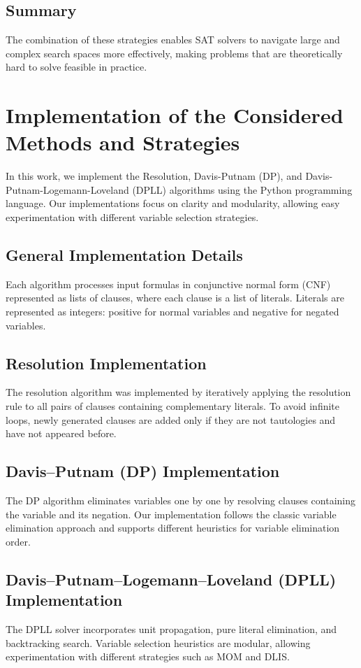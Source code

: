 \documentclass{article}
\begin{document}
\subsection{Summary}
The combination of these strategies enables SAT solvers to navigate large and complex search spaces more effectively, making problems that are theoretically hard to solve feasible in practice.

\section{Implementation of the Considered Methods and Strategies}

In this work, we implement the Resolution, Davis-Putnam (DP), and Davis-Putnam-Logemann-Loveland (DPLL) algorithms using the Python programming language. Our implementations focus on clarity and modularity, allowing easy experimentation with different variable selection strategies.

\subsection{General Implementation Details}
Each algorithm processes input formulas in conjunctive normal form (CNF) represented as lists of clauses, where each clause is a list of literals. Literals are represented as integers: positive for normal variables and negative for negated variables.

\subsection{Resolution Implementation}
The resolution algorithm was implemented by iteratively applying the resolution rule to all pairs of clauses containing complementary literals. To avoid infinite loops, newly generated clauses are added only if they are not tautologies and have not appeared before.

\subsection{Davis–Putnam (DP) Implementation}
The DP algorithm eliminates variables one by one by resolving clauses containing the variable and its negation. Our implementation follows the classic variable elimination approach and supports different heuristics for variable elimination order.

\subsection{Davis–Putnam–Logemann–Loveland (DPLL) Implementation}
The DPLL solver incorporates unit propagation, pure literal elimination, and backtracking search. Variable selection heuristics are modular, allowing experimentation with different strategies such as MOM and DLIS.
\end{document}
